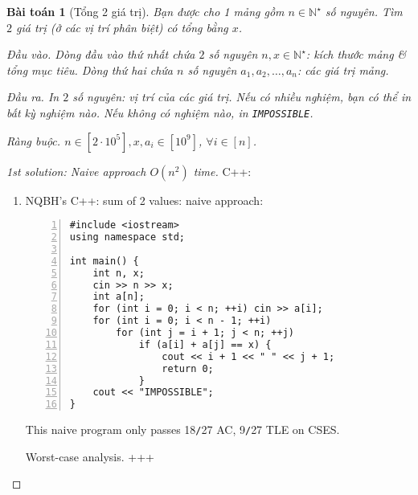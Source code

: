 \documentclass{article}
\newtheorem{baitoan}{Bài toán}
\begin{document}
\begin{baitoan}[Tổng 2 giá trị]
    Bạn được cho 1 mảng gồm $n\in\mathbb{N}^\star$ số nguyên. Tìm $2$ giá trị (ở các vị trí phân biệt) có tổng bằng $x$.
    \item {\sf Đầu vào.} Dòng đầu vào thứ nhất chứa $2$ số nguyên $n,x\in\mathbb{N}^\star$: kích thước mảng \& tổng mục tiêu. Dòng thứ hai chứa $n$ số nguyên $a_1,a_2,\ldots,a_n$: các giá trị mảng.
    \item {\sf Đầu ra.} In $2$ số nguyên: vị trí của các giá trị. Nếu có nhiều nghiệm, bạn có thể in bất kỳ nghiệm nào. Nếu không có nghiệm nào, in {\tt IMPOSSIBLE}.
    \item {\sf Ràng buộc.} $n\in[2\cdot10^5],x,a_i\in[10^9]$, $\forall i\in[n]$.
\end{baitoan}

\begin{proof}[1st solution: Naive approach $O(n^2)$ time]
    C++:
    \begin{enumerate}
        \item NQBH's C++: sum of 2 values: naive approach:
        \begin{Verbatim}[numbers=left,xleftmargin=5mm]
#include <iostream>
using namespace std;

int main() {
    int n, x;
    cin >> n >> x;
    int a[n];
    for (int i = 0; i < n; ++i) cin >> a[i];
    for (int i = 0; i < n - 1; ++i)
        for (int j = i + 1; j < n; ++j)
            if (a[i] + a[j] == x) {
                cout << i + 1 << " " << j + 1;
                return 0;
            }
    cout << "IMPOSSIBLE";
}
        \end{Verbatim}
        This naive program only passes 18{\tt/}27 AC, 9{\tt/}27 TLE on CSES.

        {\sf Worst-case analysis.} +++
    \end{enumerate}
\end{proof}
\end{document}
